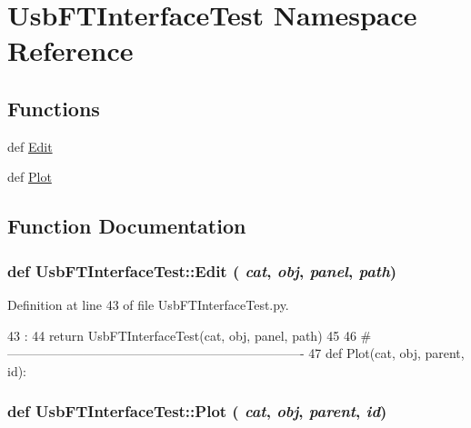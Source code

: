 \hypertarget{namespaceUsbFTInterfaceTest}{
\section{UsbFTInterfaceTest Namespace Reference}
\label{namespaceUsbFTInterfaceTest}
}
\subsection*{Functions}
\begin{DoxyCompactItemize}
\item 
def \hyperlink{namespaceUsbFTInterfaceTest_a3fa7ee97f574dfbf25e82e4d5fbe0fa1}{Edit}
\item 
def \hyperlink{namespaceUsbFTInterfaceTest_a0dd19b383421e66198a31eeae3632bbe}{Plot}
\end{DoxyCompactItemize}


\subsection{Function Documentation}
\hypertarget{namespaceUsbFTInterfaceTest_a3fa7ee97f574dfbf25e82e4d5fbe0fa1}{
\subsubsection[{Edit}]{\setlength{\rightskip}{0pt plus 5cm}def UsbFTInterfaceTest::Edit ( {\em cat}, \/   {\em obj}, \/   {\em panel}, \/   {\em path})}}
\label{namespaceUsbFTInterfaceTest_a3fa7ee97f574dfbf25e82e4d5fbe0fa1}


Definition at line 43 of file UsbFTInterfaceTest.py.


\begin{DoxyCode}
43                                 :
44     return UsbFTInterfaceTest(cat, obj, panel, path)
45 
46 #----------------------------------------------------------------------
47 
def Plot(cat, obj, parent, id):
\end{DoxyCode}
\hypertarget{namespaceUsbFTInterfaceTest_a0dd19b383421e66198a31eeae3632bbe}{
\subsubsection[{Plot}]{\setlength{\rightskip}{0pt plus 5cm}def UsbFTInterfaceTest::Plot ( {\em cat}, \/   {\em obj}, \/   {\em parent}, \/   {\em id})}}
\label{namespaceUsbFTInterfaceTest_a0dd19b383421e66198a31eeae3632bbe}


